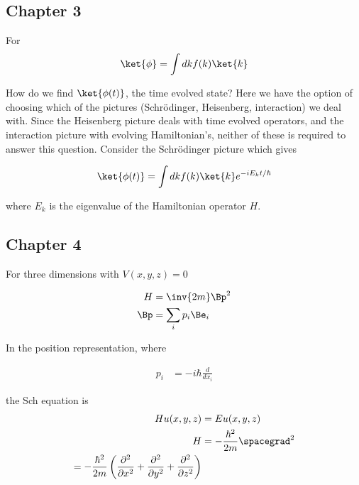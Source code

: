 \subsection{Chapter 3}

For
\begin{align*}
\ket{\phi} = \int dk f(k) \ket{k}
\end{align*}

How do we find $\ket{\phi(t)}$, the time evolved state?  Here we have the option of choosing which of the pictures (Schr\"{o}dinger, Heisenberg, interaction) we deal with.  Since the Heisenberg picture deals with time evolved operators, and the interaction picture with evolving Hamiltonian's, neither of these is required to answer this question.  Consider the Schr\"{o}dinger picture which gives

\begin{align*}
\ket{\phi(t)} = \int dk f(k) \ket{k} e^{-i E_k t/\hbar}
\end{align*}

where $E_k$ is the eigenvalue of the Hamiltonian operator $H$.


\subsection{Chapter 4}

For three dimensions with $V(x,y,z) = 0$

\begin{align*}
H &= \inv{2m} \Bp^2 \\
\Bp &= \sum_i p_i \Be_i \\
\end{align*}

In the position representation, where

\begin{align*}
p_i &= -i \hbar \frac{d}{dx_i}
\end{align*}

the Sch equation is
\begin{align*}
H u(x,y,z) &= E u(x,y,z) \\
H &= -\frac{\hbar^2}{2m} \spacegrad^2 \\
= -\frac{\hbar^2}{2m} \left(
\frac{\partial^2}{\partial {x}^2}
+\frac{\partial^2}{\partial {y}^2}
+\frac{\partial^2}{\partial {z}^2}
\right)
\end{align*}

